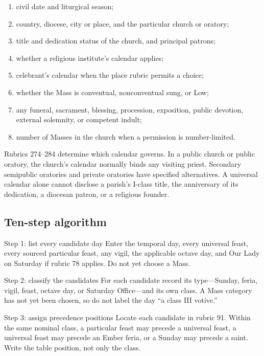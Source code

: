 \begin{enumerate}[leftmargin=1.45em]
\item civil date and liturgical season;
\item country, diocese, city or place, and the particular church or oratory;
\item title and dedication status of the church, and principal patrons;
\item whether a religious institute's calendar applies;
\item celebrant's calendar when the place rubric permits a choice;
\item whether the Mass is conventual, nonconventual sung, or Low;
\item any funeral, sacrament, blessing, procession, exposition, public devotion, external solemnity, or competent indult;
\item number of Masses in the church when a permission is number-limited.
\end{enumerate}

Rubrics 274--284 determine which calendar governs. In a public church or public oratory, the church's calendar normally binds any visiting priest. Secondary semipublic oratories and private oratories have specified alternatives. A universal calendar alone cannot disclose a parish's I-class title, the anniversary of its dedication, a diocesan patron, or a religious founder.

\subsection{Ten-step algorithm}

\begin{massbox}{Step 1: list every candidate day}
Enter the temporal day, every universal feast, every sourced particular feast, any vigil, the applicable octave day, and Our Lady on Saturday if rubric 78 applies. Do not yet choose a Mass.
\end{massbox}

\begin{massbox}{Step 2: classify the candidates}
For each candidate record its type---Sunday, feria, vigil, feast, octave day, or Saturday Office---and its own class. A Mass category has not yet been chosen, so do not label the day “a class III votive.”
\end{massbox}

\begin{massbox}{Step 3: assign precedence positions}
Locate each candidate in rubric 91. Within the same nominal class, a particular feast may precede a universal feast, a universal feast may precede an Ember feria, or a Sunday may precede a saint. Write the table position, not only the class.
\end{massbox}

